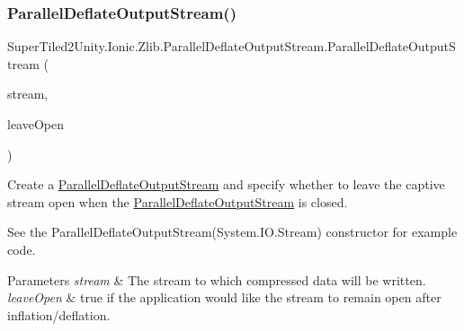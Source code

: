 \subsubsection{\texorpdfstring{Parallel\+Deflate\+Output\+Stream()}{ParallelDeflateOutputStream()}\hspace{0.1cm}{\footnotesize\ttfamily [3/5]}}
{\footnotesize\ttfamily Super\+Tiled2\+Unity.\+Ionic.\+Zlib.\+Parallel\+Deflate\+Output\+Stream.\+Parallel\+Deflate\+Output\+Stream (\begin{DoxyParamCaption}\item[{System.\+I\+O.\+Stream}]{stream,  }\item[{bool}]{leave\+Open }\end{DoxyParamCaption})}



Create a \mbox{\hyperlink{class_super_tiled2_unity_1_1_ionic_1_1_zlib_1_1_parallel_deflate_output_stream}{Parallel\+Deflate\+Output\+Stream}} and specify whether to leave the captive stream open when the \mbox{\hyperlink{class_super_tiled2_unity_1_1_ionic_1_1_zlib_1_1_parallel_deflate_output_stream}{Parallel\+Deflate\+Output\+Stream}} is closed. 

See the Parallel\+Deflate\+Output\+Stream(\+System.\+I\+O.\+Stream) constructor for example code. 


\begin{DoxyParams}{Parameters}
{\em stream} & The stream to which compressed data will be written.\\
\hline
{\em leave\+Open} & true if the application would like the stream to remain open after inflation/deflation. \\
\hline
\end{DoxyParams}
\mbox{\label{class_super_tiled2_unity_1_1_ionic_1_1_zlib_1_1_parallel_deflate_output_stream_a62fdb9a350dbbf5a5171e6dd8d294c33}} 
